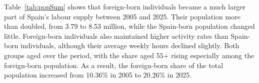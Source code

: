Table~\ref{tab:popSum} shows that foreign-born individuals became a much larger part of Spain's labour supply between 2005 and 2025. Their population more than doubled, from 3.79 to 8.53 million, while the Spain-born population changed little. Foreign-born individuals also maintained higher activity rates than Spain-born individuals, although their average weekly hours declined slightly. Both groups aged over the period, with the share aged 55+ rising especially among the foreign-born population. As a result, the foreign-born share of the total population increased from 10.36\% in 2005 to 20.26\% in 2025.



